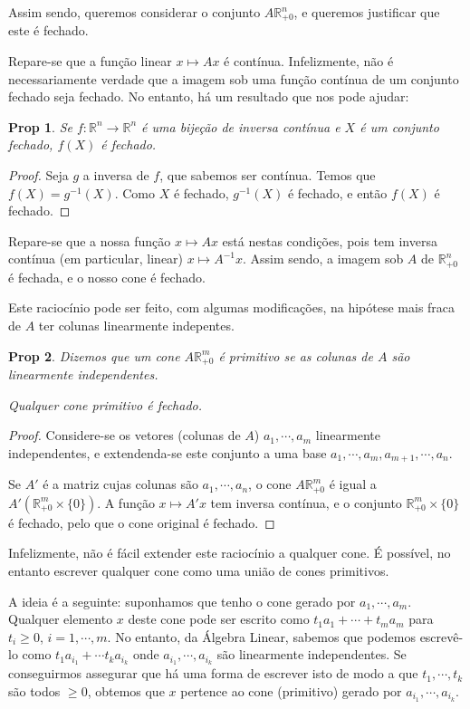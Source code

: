 \documentclass{article}
\newcommand{\R}{\mathbb{R}}
\newtheorem{prop}{Prop}
\theoremstyle{definition}
\begin{document}
	Assim sendo, queremos considerar o conjunto $A \R^n_{+0}$, e queremos justificar que este é fechado.
	
	Repare-se que a função linear $x \mapsto Ax$ é contínua. Infelizmente, não é necessariamente verdade que a imagem sob uma função contínua de um conjunto fechado seja fechado. No entanto, há um resultado que nos pode ajudar:
	
	\begin{prop}
	Se $f : \R^n \rightarrow \R^n$ é uma bijeção de inversa contínua e $X$ é um conjunto fechado, $f(X)$ é fechado.
	\end{prop}
	
	\begin{proof}
	Seja $g$ a inversa de $f$, que sabemos ser contínua. Temos que $f(X) = g^{-1}(X)$. Como $X$ é fechado, $g^{-1}(X)$ é fechado, e então $f(X)$ é fechado.
	\end{proof}
	
	Repare-se que a nossa função $x \mapsto Ax$ está nestas condições, pois tem inversa contínua (em particular, linear) $x \mapsto A^{-1} x$. Assim sendo, a imagem sob $A$ de $\R^n_{+0}$ é fechada, e o nosso cone é fechado.
	
	Este raciocínio pode ser feito, com algumas modificações, na hipótese mais fraca de $A$ ter colunas linearmente indepentes.
	
	\begin{prop}
	Dizemos que um cone $A \R^m_{+0}$ é \emph{primitivo} se as colunas de $A$ são linearmente independentes.
	
	Qualquer cone primitivo é fechado.
	\end{prop}
	
	\begin{proof}
	Considere-se os vetores (colunas de $A$) $a_1, \cdots, a_m$ linearmente independentes, e extendenda-se este conjunto a uma base $a_1, \cdots, a_m, a_{m+1}, \cdots, a_n$.
	
	Se $A'$ é a matriz cujas colunas são $a_1, \cdots, a_n$, o cone $A \R^m_{+0}$ é igual a \allowbreak ${A' (\R^m_{+0} \times \{0\})}$. A função $x \mapsto A'x$ tem inversa contínua, e o conjunto $\R^m_{+0} \times \{0\}$ é fechado, pelo que o cone original é fechado.
	\end{proof}
	
	Infelizmente, não é fácil extender este raciocínio a qualquer cone. É possível, no entanto escrever qualquer cone como uma união de cones primitivos.
	
	A ideia é a seguinte: suponhamos que tenho o cone gerado por $a_1, \cdots, a_m$. Qualquer elemento $x$ deste cone pode ser escrito como $t_1 a_1 + \cdots + t_m a_m$ para $t_i \geq 0$, $i = 1, \cdots, m$. No entanto, da Álgebra Linear, sabemos que podemos escrevê-lo como $t_1 a_{i_1} + \cdots t_k a_{i_k}$ onde $a_{i_1}, \cdots, a_{i_k}$ são linearmente independentes. Se conseguirmos assegurar que há uma forma de escrever isto de modo a que $t_1, \cdots, t_k$ são todos $\geq 0$, obtemos que $x$ pertence ao cone (primitivo) gerado por $a_{i_1}, \cdots, a_{i_k}$.
	
\end{document}
